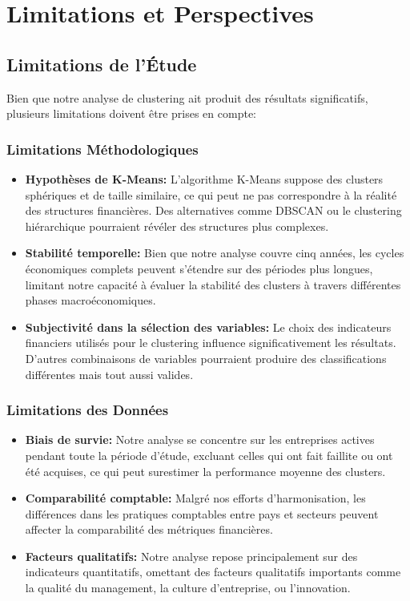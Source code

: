 \newpage
\section{Limitations et Perspectives}
\subsection{Limitations de l'Étude}
Bien que notre analyse de clustering ait produit des résultats significatifs, plusieurs limitations doivent être prises en compte:

\subsubsection{Limitations Méthodologiques}
\begin{itemize}
    \item \textbf{Hypothèses de K-Means:} L'algorithme K-Means suppose des clusters sphériques et de taille similaire, ce qui peut ne pas correspondre à la réalité des structures financières. Des alternatives comme DBSCAN ou le clustering hiérarchique pourraient révéler des structures plus complexes.
    
    \item \textbf{Stabilité temporelle:} Bien que notre analyse couvre cinq années, les cycles économiques complets peuvent s'étendre sur des périodes plus longues, limitant notre capacité à évaluer la stabilité des clusters à travers différentes phases macroéconomiques.
    
    \item \textbf{Subjectivité dans la sélection des variables:} Le choix des indicateurs financiers utilisés pour le clustering influence significativement les résultats. D'autres combinaisons de variables pourraient produire des classifications différentes mais tout aussi valides.
\end{itemize}

\subsubsection{Limitations des Données}
\begin{itemize}
    \item \textbf{Biais de survie:} Notre analyse se concentre sur les entreprises actives pendant toute la période d'étude, excluant celles qui ont fait faillite ou ont été acquises, ce qui peut surestimer la performance moyenne des clusters.
    
    \item \textbf{Comparabilité comptable:} Malgré nos efforts d'harmonisation, les différences dans les pratiques comptables entre pays et secteurs peuvent affecter la comparabilité des métriques financières.
    
    \item \textbf{Facteurs qualitatifs:} Notre analyse repose principalement sur des indicateurs quantitatifs, omettant des facteurs qualitatifs importants comme la qualité du management, la culture d'entreprise, ou l'innovation.
\end{itemize}

